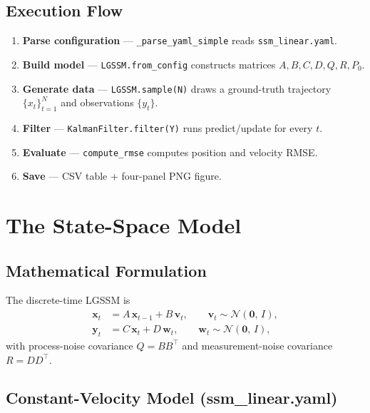 \documentclass[11pt,a4paper]{article}
\newcommand{\py}[1]{\lstinline[style=py]{#1}}
\newcommand{\file}[1]{\texttt{#1}}
\begin{document}
\subsection{Execution Flow}

\begin{enumerate}
\item \textbf{Parse configuration} ---
      \py{_parse_yaml_simple} reads \file{ssm\_linear.yaml}.
\item \textbf{Build model} ---
      \py{LGSSM.from_config} constructs matrices $A,B,C,D,Q,R,P_0$.
\item \textbf{Generate data} ---
      \py{LGSSM.sample(N)} draws a ground-truth trajectory
      $\{x_t\}_{t=1}^{N}$ and observations $\{y_t\}$.
\item \textbf{Filter} ---
      \py{KalmanFilter.filter(Y)} runs predict/update for every $t$.
\item \textbf{Evaluate} ---
      \py{compute_rmse} computes position and velocity RMSE.
\item \textbf{Save} --- CSV table + four-panel PNG figure.
\end{enumerate}


\section{The State-Space Model}
\label{sec:ssm}

\subsection{Mathematical Formulation}

The discrete-time LGSSM is
\begin{align}
  \bm{x}_t &= A\,\bm{x}_{t-1} + B\,\bm{v}_t,
    \qquad \bm{v}_t \sim \mathcal{N}(\bm{0},\,I), \label{eq:trans}\\
  \bm{y}_t &= C\,\bm{x}_t + D\,\bm{w}_t,
    \qquad \bm{w}_t \sim \mathcal{N}(\bm{0},\,I), \label{eq:obs}
\end{align}
with process-noise covariance $Q = BB^\top$ and measurement-noise
covariance $R = DD^\top$.

\subsection{Constant-Velocity Model (ssm\_linear.yaml)}
\end{document}
